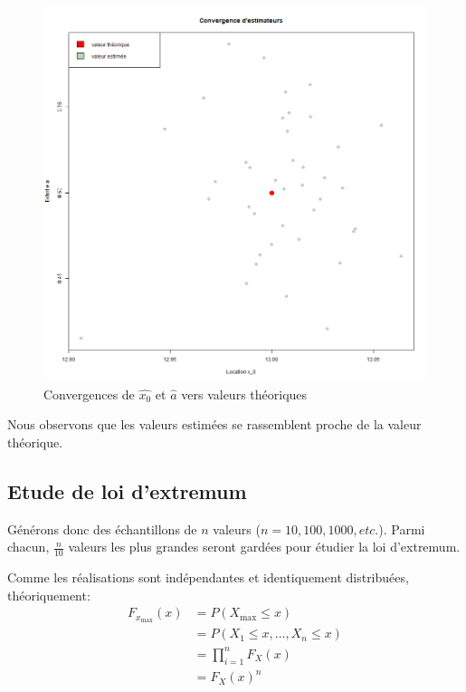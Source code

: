 \documentclass[12pt,a4paper,titlepage]{article}
\numberwithin{equation}{section}
\begin{document}
\begin{figure}[!h]
\includegraphics[width=\linewidth]{images/Cauchy_convergence_parametres.png}
\caption{Convergences de $\hat{x_0}$ et $\hat{a}$ vers valeurs théoriques}
\end{figure}

Nous observons que les valeurs estimées se rassemblent  proche de la valeur théorique.
\clearpage
\subsection{Etude de loi d'extremum}

Générons donc des échantillons de $n$ valeurs ($n=10, 100, 1000, etc.$). Parmi chacun, $\frac{n}{10}$ valeurs les plus grandes seront gardées pour étudier la loi d'extremum.

Comme les réalisations sont indépendantes et identiquement distribuées, théoriquement:
\begin{align*}
{F_{{x_{\max }}}}\left( x \right) & = P\left( {{X_{\max }} \le x} \right)\\
&  = P\left( {{X_1} \le x,...,{X_n} \le x} \right)\\
 & = \prod\limits_{i = 1}^n {{F_X}\left( x \right)} \\
 & = {F_X}{\left( x \right)^n}
\end{align*}
\end{document}
